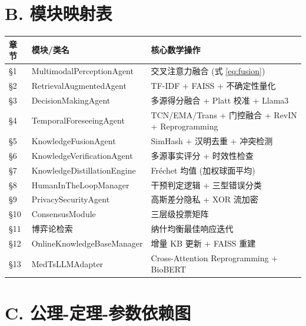 \documentclass[11pt,a4paper]{ctexart}
\theoremstyle{remark}
\begin{document}
\section*{B. 模块映射表}

\begin{longtable}{lll}
\toprule
\textbf{章节} & \textbf{模块/类名} & \textbf{核心数学操作} \\
\midrule
\S1 & MultimodalPerceptionAgent & 交叉注意力融合 (式 \ref{eq:fusion}) \\
\S2 & RetrievalAugmentedAgent & TF-IDF + FAISS + 不确定性量化 \\
\S3 & DecisionMakingAgent & 多源得分融合 + Platt 校准 + Llama3 \\
\S4 & TemporalForeseeingAgent & TCN/EMA/Trans + 门控融合 + RevIN + Reprogramming \\
\S5 & KnowledgeFusionAgent & SimHash + 汉明去重 + 冲突检测 \\
\S6 & KnowledgeVerificationAgent & 多源事实评分 + 时效性检查 \\
\S7 & KnowledgeDistillationEngine & Fr\'{e}chet 均值 (加权球面平均) \\
\S8 & HumanInTheLoopManager & 干预判定逻辑 + 三型错误分类 \\
\S9 & PrivacySecurityAgent & 高斯差分隐私 + XOR 流加密 \\
\S10 & ConsensusModule & 三层级投票矩阵 \\
\S11 & 博弈论检索 & 纳什均衡最佳响应迭代 \\
\S12 & OnlineKnowledgeBaseManager & 增量 KB 更新 + FAISS 重建 \\
\S13 & MedTsLLMAdapter & Cross-Attention Reprogramming + BioBERT \\
\bottomrule
\end{longtable}

\section*{C. 公理-定理-参数依赖图}
\end{document}
